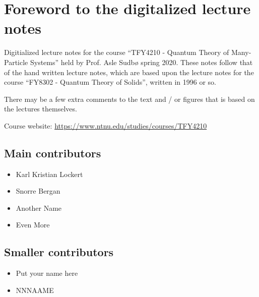 \section*{Foreword to the digitalized lecture notes}

Digitialized lecture notes for the course ``TFY4210 - Quantum Theory of Many-Particle Systems'' held by Prof. Asle Sudbø spring 2020. These notes follow that of the hand written lecture notes, which are based upon the lecture notes for the course ``FY8302 - Quantum Theory of Solids'', written in 1996 or so. 

There may be a few extra comments to the text and / or figures that is based on the lectures themselves. 


Course website: \href{https://www.ntnu.edu/studies/courses/TFY4210}{https://www.ntnu.edu/studies/courses/TFY4210}



\subsection*{Main contributors}
	\begin{multicols}{2}
\begin{itemize}
	\item Karl Kristian Lockert
	\item Snorre Bergan
	\item Another Name
	\item Even More
\end{itemize}
\end{multicols}

\subsection*{Smaller contributors}
\begin{multicols}{2}
\begin{itemize}
	\item Put your name here
	\item NNNAAME
\end{itemize}
\end{multicols}

